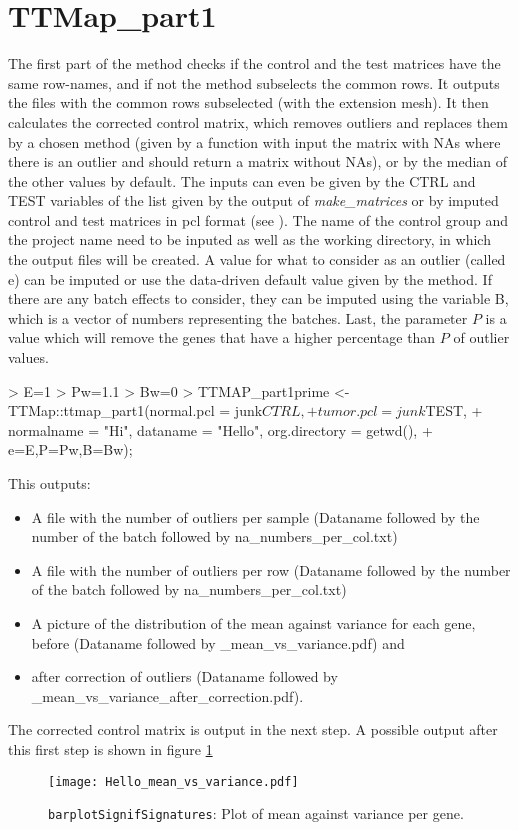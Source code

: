 \documentclass[a4paper,12pt]{article}
\begin{document}
\section{TTMap\_part1}
The first part of the method checks if the control and the test matrices 
have the same row-names, and if not the method subselects the common 
rows. It outputs the files with the common rows subselected (with the 
extension mesh).  It then calculates the corrected control matrix, which 
removes outliers and replaces them by a chosen method (given by a 
function with input the matrix with NAs where there is an outlier and 
should 
return a matrix without NAs), or by the median of the other values by 
default. The inputs can even be given by the CTRL and TEST variables of 
the list given by the output of \emph{make\_matrices} or by imputed 
control and test matrices in pcl format (see \cite{Monica}). The name of 
the control group and the project name need to be inputed as well as the 
working directory, in which the output files will be created. 
A value for what to consider as an outlier (called e)
can be imputed or use the data-driven 
default value given by the method. If there are any batch effects to 
consider, they can be imputed using the variable B, which is a vector of 
numbers representing the batches. Last, the parameter $P$ is a value 
which will remove the genes that have a higher percentage than $P$ of 
outlier values. 
\begin{scriptsize}
\begin{Schunk}
\begin{Sinput}
> E=1
> Pw=1.1
> Bw=0
> TTMAP_part1prime <-TTMap::ttmap_part1(normal.pcl = junk$CTRL,
+ tumor.pcl = junk$TEST, 
+ normalname = "Hi", dataname = "Hello", org.directory = getwd(),
+ e=E,P=Pw,B=Bw);
\end{Sinput}
\end{Schunk}
\end{scriptsize}
This outputs: 
\begin{itemize}
\item A file with the number of outliers per sample (Dataname followed by 
the number of the batch followed by na\_numbers\_per\_col.txt)
\item A file with the number of outliers per row (Dataname followed by 
the 
number of the batch followed by na\_numbers\_per\_col.txt)
\item A picture of the distribution of the mean against variance for each 
gene, before (Dataname followed by \_mean\_vs\_variance.pdf) and
\item after correction of outliers (Dataname followed by \\
\_mean\_vs\_variance\_after\_correction.pdf).
\end{itemize}
The corrected control matrix is output in the next step.
A possible output after this first step is shown in figure 
\ref{fig_mean_vs_var}
\begin{center}
\begin{figure}
\texttt{[image: Hello\_mean\_vs\_variance.pdf]}
\caption{\texttt{barplotSignifSignatures}: Plot of mean against variance 
per 
gene.}
\label{fig_mean_vs_var}
\end{figure}
\end{center}
\end{document}

